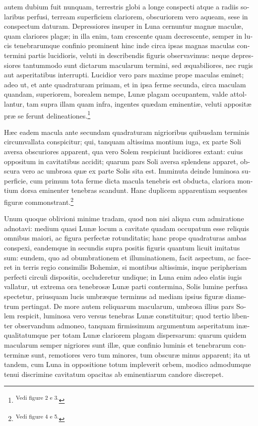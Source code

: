 \documentclass[11pt,twoside,openany]{book}
\begin{document}
\begin{otherlanguage}{latin}
autem dubium fuit nunquam, terrestris globi a longe conspecti atque a radiis solaribus perfusi, terream superficiem clariorem, obscuriorem vero aqueam, sese in conspectum daturam. Depressiores insuper in Luna cernuntur magnæ maculæ, quam clariores plagæ; in illa enim, tam crescente quam decrescente, semper in lucis tenebrarumque confinio prominent hinc inde circa ipsas magnas maculas contermini partis lucidioris, veluti in describendis figuris observavimus: neque depressiores tantummodo sunt dictarum macularum termini, sed æquabiliores, nec rugis aut asperitatibus interrupti. Lucidior vero pars maxime prope maculas eminet; adeo ut, et ante quadraturam primam, et in ipsa ferme secunda, circa maculam quandam, superiorem, borealem nempe, Lunæ plagam occupantem, valde attollantur, tam supra illam quam infra, ingentes quædam eminentiæ, veluti appositæ præ se ferunt delineationes.\footnote{\textsuperscript{Vedi figure 2 e 3.}}~

Hæc eadem macula ante secundam quadraturam nigrioribus quibusdam terminis circumvallata conspicitur; qui, tanquam altissima montium iuga, ex parte Soli aversa obscuriores apparent, qua vero Solem respiciunt lucidiores extant: cuius oppositum in cavitatibus accidit; quarum pars Soli aversa splendens apparet, obscura vero ac umbrosa quæ ex parte Solis sita est. Imminuta deinde luminosa superficie, cum primum tota ferme dicta macula tenebris est obducta, clariora montium dorsa eminenter tenebras scandunt. Hanc duplicem apparentiam sequentes figuræ commonstrant.\footnote{\textsuperscript{Vedi figure 4 e 5.}}

Unum quoque oblivioni minime tradam, quod non nisi aliqua cum admiratione adnotavi: medium quasi Lunæ locum a cavitate quadam occupatum esse reliquis omnibus maiori, ac figura perfectæ rotunditatis; hanc prope quadraturas ambas conspexi, eandemque in secundis supra positis figuris quantum licuit imitatus sum: eundem, quo ad obumbrationem et illuminationem, facit aspectum, ac faceret in terris regio consimilis Bohemiæ, si montibus altissimis, inque peripheriam perfecti circuli dispositis, occluderetur undique; in Luna enim adeo elatis iugis vallatur, ut extrema ora tenebrosæ Lunæ parti contermina, Solis lumine perfusa spectetur, priusquam lucis umbræque terminus ad mediam ipsius figuræ diametrum pertingat. De more autem reliquarum macularum, umbrosa illius pars Solem respicit, luminosa vero versus tenebras Lunæ constituitur; quod tertio libenter observandum admoneo, tanquam firmissimum argumentum asperitatum inæqualitatumque per totam Lunæ clariorem plagam dispersarum: quarum quidem macularum semper nigriores sunt illæ, quæ confinio luminis et tenebrarum conterminæ sunt, remotiores vero tum minores, tum obscuræ minus apparent; ita ut tandem, cum Luna in oppositione totum impleverit orbem, modico admodumque tenui discrimine cavitatum opacitas ab eminentiarum candore discrepet.


\end{otherlanguage}
\end{document}
